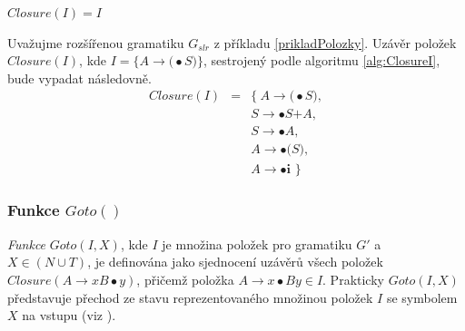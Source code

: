 \begin{algorithm}[H]
  \DontPrintSemicolon
  \SetAlgoNoLine
  \SetAlgoNoEnd
  \BlankLine

  \SetNlSty{}{}{:}
  \SetNlSkip{-1.1em}

  \Indp\Indpp
  $Closure(I) = I$
  \;


  \caption{\textsc{$Closure(I)$}} \label{alg:ClosureI}
\end{algorithm}

\begin{priklad}
  Uvažujme rozšířenou gramatiku $G_{slr}$ z příkladu \ref{prikladPolozky}. Uzávěr položek $Closure(I)$, kde $I = \{A \rightarrow \textbf{(}\!\bullet\!S \textbf{)} \}$,
  sestrojený podle algoritmu \ref{alg:ClosureI}, bude vypadat následovně.
  \begin{eqnarray*}
    Closure(I)  & = & \{\ A \rightarrow \textbf{(}\!\bullet\!S \textbf{)}, \\
                &   & S \rightarrow \bullet S \textbf{+} A, \\
                &   & S \rightarrow \bullet A, \\
                &   & A \rightarrow \bullet \textbf{(} S \textbf{)}, \\
                &   & A \rightarrow \bullet \textbf{i }\}
  \end{eqnarray*}
\end{priklad}

\subsubsection{Funkce $Goto()$}

\emph{Funkce} $Goto(I, X)$, kde $I$ je množina položek pro gramatiku $G'$ a $X \in (N \cup T)$, je definována jako sjednocení uzávěrů všech položek $Closure(A \rightarrow x B \bullet y)$, přičemž
položka \linebreak $A \rightarrow x \bullet B y \in I$. Prakticky $Goto(I, X)$ představuje přechod ze stavu reprezentovaného množinou položek $I$ se symbolem $X$ na vstupu (viz \cite{Alfred:2007:Compilers}).

